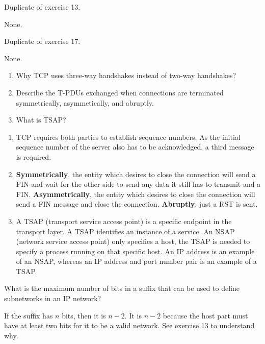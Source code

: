 \begin{Exercise}
Duplicate of exercise 13.
\end{Exercise}
\begin{Answer}
None.
\end{Answer}

\begin{Exercise}
Duplicate of exercise 17.
\end{Exercise}
\begin{Answer}
None.
\end{Answer}

\begin{Exercise}
\end{Exercise}

\begin{Exercise}
\begin{enumerate}
\item Why TCP uses three-way handshakes instead of two-way handshakes?
\item Describe the T-PDUs exchanged when connections are terminated symmetrically, asymmetically, and abruptly.
\item What is TSAP?
\end{enumerate}
\end{Exercise}
\begin{Answer}
\begin{enumerate}
\item TCP requires both parties to establish sequence numbers. As the initial sequence number of the server also has to be acknowledged, a third message is required.
\item \textbf{Symmetrically}, the entity which desires to close the connection will send a FIN and wait for the other side to send any data it still has to transmit and a FIN. \textbf{Asymmetrically}, the entity which desires to close the connection will send a FIN message and close the connection. \textbf{Abruptly}, just a RST is sent.
\item A TSAP (transport service access point) is a specific endpoint in the transport layer. A TSAP identifies an instance of a service.
An NSAP (network service access point) only specifies a host, the TSAP is needed to specify a process running on that specific host.
An IP address is an example of an NSAP, whereas an IP address and port number pair is an example of a TSAP.
\end{enumerate}
\end{Answer}

\begin{Exercise}
What is the maximum number of bits in a suffix that can be used to define subnetworks in an IP network?
\end{Exercise}
\begin{Answer}
If the suffix has \(n\) bits, then it is \(n - 2\).
It is \(n - 2\) because the host part must have at least two bits for it to be a valid network.
See exercise 13 to understand why.
\end{Answer}


